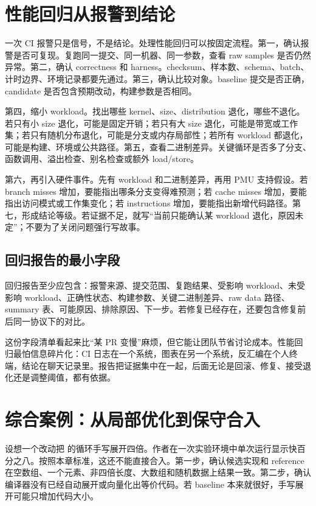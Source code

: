 \section{性能回归从报警到结论}

一次 CI 报警只是信号，不是结论。处理性能回归可以按固定流程。第一，确认报警是否可复现。复跑同一提交、同一机器、同一参数，查看 raw samples 是否仍然异常。第二，确认 correctness 和 harness。checksum、样本数、schema、batch、计时边界、环境记录都要先通过。第三，确认比较对象。baseline 提交是否正确，candidate 是否包含预期改动，构建参数是否相同。

第四，缩小 workload。找出哪些 kernel、size、distribution 退化，哪些不退化。若只有小 size 退化，可能是固定开销；若只有大 size 退化，可能是带宽或工作集；若只有随机分布退化，可能是分支或内存局部性；若所有 workload 都退化，可能是构建、环境或公共路径。第五，查看二进制差异。关键循环是否多了分支、函数调用、溢出检查、别名检查或额外 load/store。

第六，再引入硬件事件。先有 workload 和二进制差异，再用 PMU 支持假设。若 branch misses 增加，要能指出哪条分支变得难预测；若 cache misses 增加，要能指出访问模式或工作集变化；若 instructions 增加，要能指出新增代码路径。第七，形成结论等级。若证据不足，就写“当前只能确认某 workload 退化，原因未定”；不要为了关闭问题强行写故事。

\subsection{回归报告的最小字段}

回归报告至少应包含：报警来源、提交范围、复跑结果、受影响 workload、未受影响 workload、正确性状态、构建参数、关键二进制差异、raw data 路径、summary 表、可能原因、排除原因、下一步。若修复已经存在，还要包含修复前后同一协议下的对比。

这份字段清单看起来比“某 PR 变慢”麻烦，但它能让团队节省讨论成本。性能回归最怕信息碎片化：CI 日志在一个系统，图表在另一个系统，反汇编在个人终端，结论在聊天记录里。报告把证据集中在一起，后面无论是回滚、修复、接受退化还是调整阈值，都有依据。

\section{综合案例：从局部优化到保守合入}

设想一个改动把  的循环手写展开四倍。作者在一次实验环境中单次运行显示快百分之八。按照本章标准，这还不能直接合入。第一步，确认候选实现和 reference 在空数组、一个元素、非四倍长度、大数组和随机数据上结果一致。第二步，确认编译器没有已经自动展开或向量化出等价代码。若 baseline 本来就很好，手写展开可能只增加代码大小。

